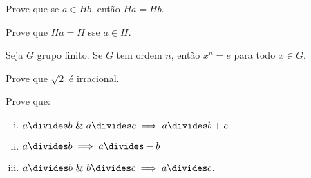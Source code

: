 \begin{exercise}
	Prove que se $a \in Hb$, então $Ha = Hb$.
\end{exercise}

\begin{exercise}
	Prove que $Ha = H$ sse $a \in H$.
\end{exercise}

\begin{exercise}
	Seja $G$ grupo finito. Se $G$ tem ordem $n$, então $x^n = e$ para todo $x \in G$.
\end{exercise}

\begin{exercise}
	Prove que $\sqrt 2$ é irracional.
\end{exercise}

\begin{exercise}
	Prove que:
	\begin{enumerate}[(i)]
		\item $a \divides b \ \& \  a \divides c \implies a \divides b + c$
		\item $a \divides b \implies a \divides -b$
		\item $a \divides b \ \& \ b \divides c \implies a \divides c$.
	\end{enumerate}
\end{exercise}
